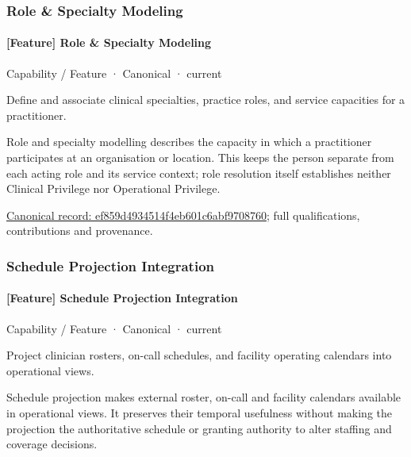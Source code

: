 \subsubsection{Role \& Specialty Modeling}

\paragraph{[Feature] Role \& Specialty Modeling}

\label{element:ef859d4934514f4eb601c6abf9708760}
{\small Capability / Feature · Canonical · current}\par

Define and associate clinical specialties, practice roles, and service capacities for a practitioner.



Role and specialty modelling describes the capacity in which a practitioner participates at an organisation or location. This keeps the person separate from each acting role and its service context; role resolution itself establishes neither Clinical Privilege nor Operational Privilege.


{\footnotesize \href{../../../../continuum/strategy/capability/feature/ef859d4934514f4eb601c6abf9708760.md}{Canonical record: ef859d4934514f4eb601c6abf9708760}; full qualifications, contributions and provenance.}\par
\subsubsection{Schedule Projection Integration}

\paragraph{[Feature] Schedule Projection Integration}

\label{element:883a68ab282b462988d5ae7a6ea2e980}
{\small Capability / Feature · Canonical · current}\par

Project clinician rosters, on-call schedules, and facility operating calendars into operational views.



Schedule projection makes external roster, on-call and facility calendars available in operational views. It preserves their temporal usefulness without making the projection the authoritative schedule or granting authority to alter staffing and coverage decisions.



